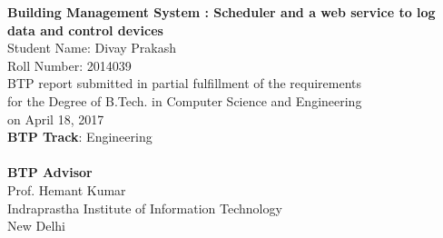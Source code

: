 \def\degree{B.Tech. in Computer Science and Engineering}
\def\btptrack{Engineering}
\def\submissiondate{April 18, 2017}
\def\supervisor{Prof. Hemant Kumar}
\def\student{Divay Prakash}
\def\rollnumber{2014039}
\def\titlelineone{Building Management System}
\def\titlelinetwo{Scheduler and a web service to log data and control devices}

\thispagestyle{empty}
\vspace{5.65in}

\begin{center}
\vspace{5.65in}
{\LARGE \bf \titlelineone{} : \titlelinetwo{}\\}
\vspace{.3in}
{\Large{Student Name: \student{}}}\\  
{\large{Roll Number: \rollnumber{}}}\\
\vspace{.1in} 
\vspace{.65in}
\vspace{.65in}
{BTP report submitted in partial fulfillment of the requirements 
\\for the Degree of \degree{}\\}
on \submissiondate{}\\
\vspace{.65in}
\textbf{BTP Track}: \btptrack\\
\quad\\
{\textbf{BTP Advisor}\\ 
\supervisor\\} 
\vspace{3.0in}
{Indraprastha Institute of Information Technology\\
New Delhi}
\end{center}
